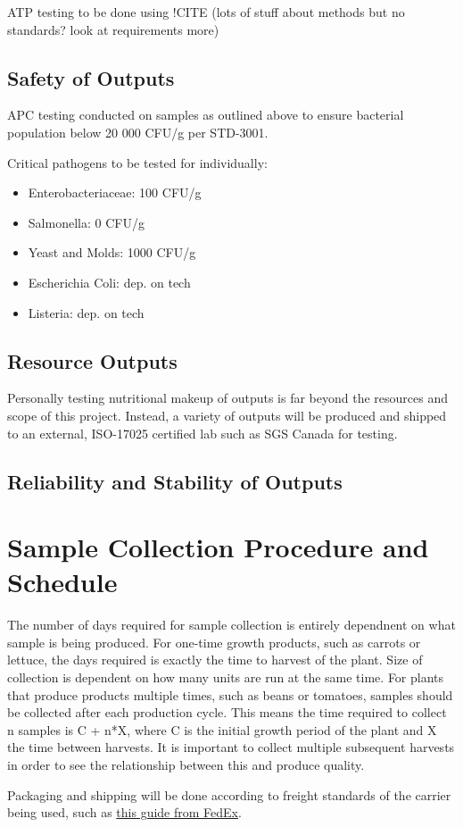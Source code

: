 ATP testing to be done using !CITE (lots of stuff about methods but no standards? look at requirements more)

\subsection{Safety of Outputs}
APC testing conducted on samples as outlined above to ensure bacterial population below 20 000 CFU/g per STD-3001.

Critical pathogens to be tested for individually:
\begin{itemize}
    \item Enterobacteriaceae: 100 CFU/g
    \item Salmonella: 0 CFU/g
    \item Yeast and Molds: 1000 CFU/g
    \item Escherichia Coli: dep. on tech
    \item Listeria: dep. on tech
\end{itemize}


\subsection{Resource Outputs}
Personally testing nutritional makeup of outputs is far beyond the resources and scope of this project. Instead, a variety of outputs will be produced and shipped to an external, ISO-17025 certified lab such as SGS Canada for testing.

\subsection{Reliability and Stability of Outputs}

\section{Sample Collection Procedure and Schedule}
The number of days required for sample collection is entirely dependnent on what sample is being produced. For one-time growth products, such as carrots or lettuce, the days required is exactly the time to harvest of the plant. Size of collection is dependent on how many units are run at the same time. For plants that produce products multiple times, such as beans or tomatoes, samples should be collected after each production cycle. This means the time required to collect n samples is C + n*X, where C is the initial growth period of the plant and X the time between harvests. It is important to collect multiple subsequent harvests in order to see the relationship between this and produce quality.

Packaging and shipping will be done according to freight standards of the carrier being used, such as \href{https://www.fedex.com/en-us/shipping/how-to-ship-perishables.html#1}{this guide from FedEx}. 